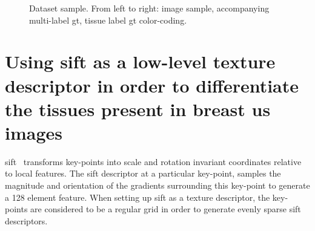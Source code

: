 \documentclass[a4paper, 10pt, conference]{llncs}      %
\begin{document}
\begin{figure}[Hbp]

\caption{Dataset sample. From left to right: image sample, accompanying multi-label \ac{gt}, tissue label \ac{gt} color-coding.}
\label{fig:dataExample}
\end{figure}

\section{Using \ac{sift} as a low-level texture descriptor in order to differentiate the tissues present in breast \acs{us} images}
\acf{sift}~\cite{lowe2004distinctive} transforms key-points into scale and rotation invariant coordinates relative to local features. The \ac{sift} descriptor at a particular key-point, samples the magnitude and orientation of the gradients surrounding this key-point to generate a 128 element feature. When setting up \ac{sift} as a texture descriptor, the key-points are considered to be a regular grid in order to generate evenly sparse \ac{sift} descriptors.
\end{document}
